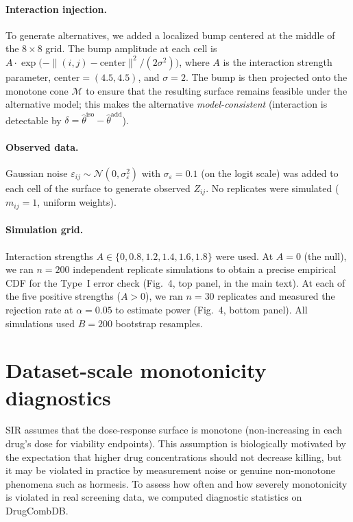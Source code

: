 \documentclass[pdflatex,sn-nature]{sn-jnl}%
\begin{document}
\paragraph{Interaction injection.}
To generate alternatives, we added a localized bump centered at the middle of the $8\times 8$ grid.
The bump amplitude at each cell is $A \cdot \exp\!\bigl(-\|(i,j)-\mathrm{center}\|^2 / (2\sigma^2)\bigr)$, where $A$ is the interaction strength parameter, $\mathrm{center}=(4.5, 4.5)$, and $\sigma = 2$.
The bump is then projected onto the monotone cone $\mathcal{M}$ to ensure that the resulting surface remains feasible under the alternative model; this makes the alternative \emph{model-consistent} (interaction is detectable by $\delta = \hat\theta^{\mathrm{iso}} - \hat\theta^{\mathrm{add}}$).

\paragraph{Observed data.}
Gaussian noise $\varepsilon_{ij} \sim \mathcal{N}(0, \sigma^2_\varepsilon)$ with $\sigma_\varepsilon = 0.1$ (on the logit scale) was added to each cell of the surface to generate observed $Z_{ij}$.
No replicates were simulated ($m_{ij}=1$, uniform weights).

\paragraph{Simulation grid.}
Interaction strengths $A \in \{0, 0.8, 1.2, 1.4, 1.6, 1.8\}$ were used.
At $A=0$ (the null), we ran $n=200$ independent replicate simulations to obtain a precise empirical CDF for the Type~I error check (Fig.~4, top panel, in the main text).
At each of the five positive strengths ($A > 0$), we ran $n=30$ replicates and measured the rejection rate at $\alpha=0.05$ to estimate power (Fig.~4, bottom panel).
All simulations used $B=200$ bootstrap resamples.

\section{Dataset-scale monotonicity diagnostics}

SIR assumes that the dose-response surface is monotone (non-increasing in each drug's dose for viability endpoints).
This assumption is biologically motivated by the expectation that higher drug concentrations should not decrease killing, but it may be violated in practice by measurement noise or genuine non-monotone phenomena such as hormesis.
To assess how often and how severely monotonicity is violated in real screening data, we computed diagnostic statistics on DrugCombDB.
\end{document}

